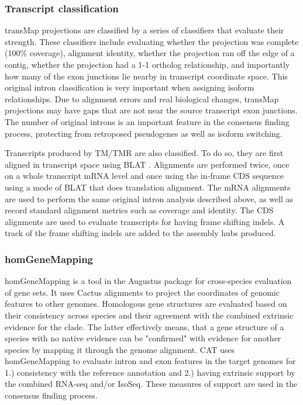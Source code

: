 \documentclass[fleqn,10pt]{wlscirep}
\begin{document}
\subsubsection{Transcript classification}
	transMap projections are classified by a series of classifiers that evaluate their strength. These classifiers include evaluating whether the projection was complete (100\% coverage), alignment identity, whether the projection ran off the edge of a contig, whether the projection had a 1-1 ortholog relationship, and importantly how many of the exon junctions lie nearby in transcript coordinate space. This original intron classification is very important when assigning isoform relationships. Due to alignment errors and real biological changes, transMap projections may have gaps that are not near the source transcript exon junctions. The number of original introns is an important feature in the consensus finding process, protecting from retroposed pseudogenes as well as isoform switching.
    
	Transcripts produced by TM/TMR are also classified. To do so, they are first aligned in transcript space using BLAT \cite{kent2002blat}. Alignments are performed twice, once on a whole transcript mRNA level and once using the in-frame CDS sequence using a mode of BLAT that does translation alignment. The mRNA alignments are used to perform the same original intron analysis described above, as well as record standard alignment metrics such as coverage and identity. The CDS alignments are used to evaluate transcripts for having frame shifting indels. A track of the frame shifting indels are added to the assembly hubs produced.

\subsubsection{homGeneMapping}
	homGeneMapping is a tool in the Augustus package for cross-species evaluation of gene sets. It uses Cactus alignments to project the coordinates of genomic features to other genomes. Homologous gene structures are evaluated based on their consistency across species and their agreement with the combined extrinsic evidence for the clade. The latter effectively means, that a gene structure of a species with no native evidence can be "confirmed" with evidence for another species by mapping it through the genome alignment. CAT uses homGeneMapping to evaluate intron and exon features in the target genomes for 1.) consistency with the reference annotation and 2.) having extrinsic support by the combined RNA-seq and/or IsoSeq. These measures of support are used in the consensus finding process.
\end{document}
